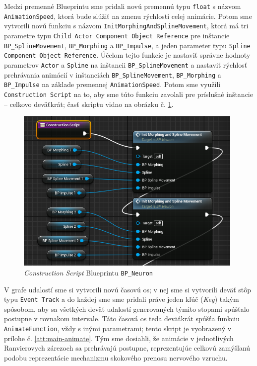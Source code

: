 Medzi premenné Blueprintu sme pridali novú premennú typu \texttt{float} s názvom \texttt{AnimationSpeed}, ktorá bude slúžiť na zmenu rýchlosti celej animácie. Potom sme vytvorili novú funkciu s názvom \texttt{InitMorphingAndSplineMovement}, ktorá má tri parametre typu \texttt{Child Actor Component Object Reference} pre inštancie \texttt{BP\_SplineMovement}, \texttt{BP\_Morphing} a \texttt{BP\_Impulse}, a jeden parameter typu 
\texttt{Spline Component Object Reference}. Účelom tejto funkcie je nastaviť správne hodnoty parametrov \texttt{Actor} a \texttt{Spline} na inštancii \texttt{BP\_SplineMovement} a nastaviť rýchlosť prehrávania animácií v inštanciách
\texttt{BP\_SplineMovement}, \texttt{BP\_Morphing} a \texttt{BP\_Impulse} na základe premennej \texttt{AnimationSpeed}. Potom sme využili \texttt{Construction Script} na to, aby sme túto funkciu zavolali pre príslušné inštancie {--} 
celkovo deväťkrát; časť skriptu vidno na obrázku č. \ref{constr-script}.

\begin{figure}[!htbp]
  \centering
  \includegraphics[width=11cm]{img/constr-script.png}
  \caption{\emph{Construction Script} Blueprintu \texttt{BP\_Neuron}}
  \label{constr-script}
\end{figure}

V grafe udalostí sme si vytvorili novú časovú os; v nej sme si vytvorili deväť stôp typu \texttt{Event Track} a do každej sme sme pridali práve jeden kľúč (\emph{Key}) takým spôsobom, aby sa všetkých deväť udalostí generovaných
týmito stopami spúšťalo postupne v rovnakom intervale. Táto časová os teda deväťkrát spúšťa funkciu \texttt{AnimateFunction}, vždy s inými parametrami; tento skript je vyobrazený v prílohe č. \ref{att:main-animate}.
Tým sme dosiahli, že animácie v jednotlivých Ranvierovych zárezoch sa prehrávajú postupne, reprezentujúc celkovú zamýšľanú podobu reprezentácie mechanizmu skokového prenosu nervového vzruchu.

